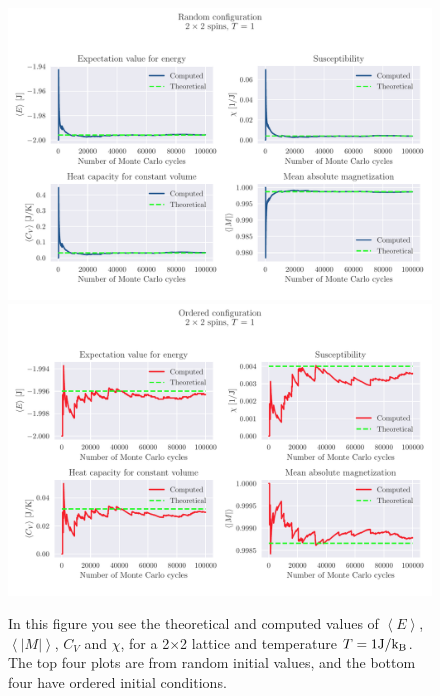 \documentclass[reprint, english,notitlepage,nofootinbib]{revtex4-1}  %
\begin{document}
\begin{figure}[!htb]
	\includegraphics[width=16cm]{../output/c/L2-T1-dT0_0-NT1-N5-RandomTrue-CompCycle.pdf}
	\includegraphics[width=16cm]{../output/c/L2-T1-dT0_0-NT1-N5-RandomFalse-CompCycle.pdf}
	\caption{In this figure you see the theoretical and computed values of $\left<E\right>$, $\left<|M|\right>$, $C_V$ and $\chi$, for a 2$\times$2 lattice and temperature $T=1\rm{J}/k_B$. The top four plots are from random initial values, and the bottom four have ordered initial conditions.}
	\label{fig:L2_T1_Random_and_not}
\end{figure}
\end{document}
